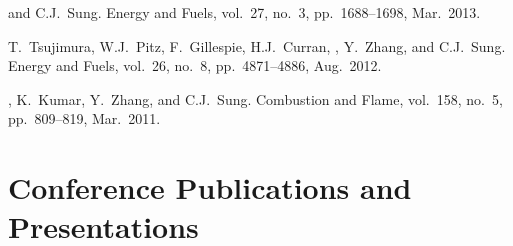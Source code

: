 \begin{bibmune}
\item {} and C.J.\ Sung. 
        Energy and Fuels, vol.\ 27, no.\ 3, pp.\ 1688--1698, Mar.\ 2013. \\

\item T.\ Tsujimura, W.J.\ Pitz, F.\ Gillespie, H.J.\ Curran,
        , Y.\ Zhang, and C.J.\ Sung.
         Energy and Fuels, vol.\ 26, no.\ 8, pp.\ 4871--4886,
        Aug.\ 2012. 

\item {}, K.\ Kumar, Y.\ Zhang, and C.J.\ Sung.
         Combustion and Flame,
        vol.\ 158, no.\ 5, pp.\ 809--819, Mar.\ 2011.\\
\end{bibmune}

\section{{\sectionfont Conference Publications and Presentations}}

